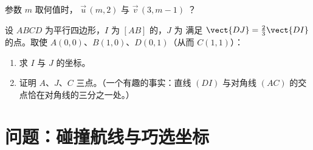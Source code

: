 \begin{exercise}[$\star\star$]\label{exo:g11:vect:10}
参数 $m$ 取何值时，
$\vec u\,(m, 2)$ 与 $\vec v\,(3, m - 1)$ ？
\end{exercise}

\begin{exercise}[$\star\star\star$]\label{exo:g11:vect:11}
设 $ABCD$ 为平行四边形，$I$ 为 $[AB]$ 的，$J$ 为
满足 $\vect{DJ} = \frac23 \vect{DI}$ 的点。取使
$A(0,0)$、$B(1,0)$、$D(0,1)$（从而 $C(1,1)$）：
\begin{enumerate}
  \item 求 $I$ 与 $J$ 的坐标。
  \item 证明 $A$、$J$、$C$ 三点。（一个有趣的事实：直线
        $(DI)$ 与对角线 $(AC)$ 的交点恰在对角线的三分之一处。）
\end{enumerate}
\end{exercise}

\section{问题：碰撞航线与巧选坐标}

